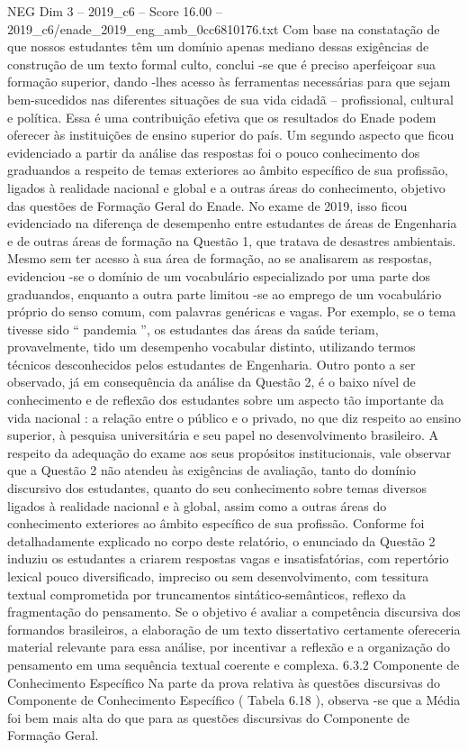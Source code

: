 \begin{textsample}{NEG Dim 3 – 2019\_c6 – Score 16.00 – 2019\_c6/enade\_2019\_eng\_amb\_0cc6810176.txt}
Com base na constatação de que nossos estudantes têm um domínio apenas mediano dessas exigências de construção de um texto formal culto, conclui -se que é preciso aperfeiçoar sua formação superior, dando -lhes acesso às ferramentas necessárias para que sejam bem-sucedidos nas diferentes situações de sua vida cidadã – profissional, cultural e política.
Essa é uma contribuição efetiva que os resultados do Enade podem oferecer às instituições de ensino superior do país.
Um segundo aspecto que ficou evidenciado a partir da análise das respostas foi o pouco conhecimento dos graduandos a respeito de temas exteriores ao âmbito específico de sua profissão, ligados à realidade nacional e global e a outras áreas do conhecimento, objetivo das questões de Formação Geral do Enade.
No exame de 2019, isso ficou evidenciado na diferença de desempenho entre estudantes de áreas de Engenharia e de outras áreas de formação na Questão 1, que tratava de desastres ambientais.
Mesmo sem ter acesso à sua área de formação, ao se analisarem as respostas, evidenciou -se o domínio de um vocabulário especializado por uma parte dos graduandos, enquanto a outra parte limitou -se ao emprego de um vocabulário próprio do senso comum, com palavras genéricas e vagas.
Por exemplo, se o tema tivesse sido “ pandemia ”, os estudantes das áreas da saúde teriam, provavelmente, tido um desempenho vocabular distinto, utilizando termos técnicos desconhecidos pelos estudantes de Engenharia.
Outro ponto a ser observado, já em consequência da análise da Questão 2, é o baixo nível de conhecimento e de reflexão dos estudantes sobre um aspecto tão importante da vida nacional : a relação entre o público e o privado, no que diz respeito ao ensino superior, à pesquisa universitária e seu papel no desenvolvimento brasileiro.
A respeito da adequação do exame aos seus propósitos institucionais, vale observar que a Questão 2 não atendeu às exigências de avaliação, tanto do domínio discursivo dos estudantes, quanto do seu conhecimento sobre temas diversos ligados à realidade nacional e à global, assim como a outras áreas do conhecimento exteriores ao âmbito específico de sua profissão.
Conforme foi detalhadamente explicado no corpo deste relatório, o enunciado da Questão 2 induziu os estudantes a criarem respostas vagas e insatisfatórias, com repertório lexical pouco diversificado, impreciso ou sem desenvolvimento, com tessitura textual comprometida por truncamentos sintático-semânticos, reflexo da fragmentação do pensamento.
Se o objetivo é avaliar a competência discursiva dos formandos brasileiros, a elaboração de um texto dissertativo certamente ofereceria material relevante para essa análise, por incentivar a reflexão e a organização do pensamento em uma sequência textual coerente e complexa. 6.3.2 Componente de Conhecimento Específico Na parte da prova relativa às questões discursivas do Componente de Conhecimento Específico ( Tabela 6.18 ), observa -se que a Média foi bem mais alta do que para as questões discursivas do Componente de Formação Geral.

\end{textsample}
